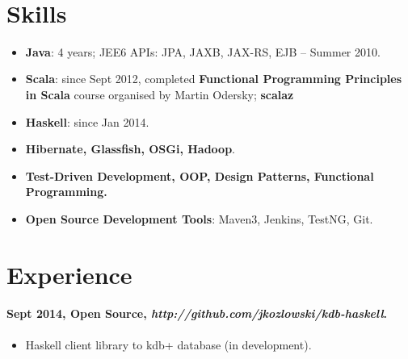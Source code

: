 \documentclass[11pt, a4paper]{article}
\newlength{\wideitemsep}
\let\olditem\item
\renewcommand{\item}{\setlength{\itemsep}{\wideitemsep}\olditem}
\begin{document}
\textsf{\\[0.1in]}


\section*{Skills}
\begin{itemize}
\item \textbf{Java}: 4 years; JEE6 APIs: JPA, JAXB, JAX-RS, EJB – Summer 2010.
\item \textbf{Scala}: since Sept 2012, completed \textbf{Functional Programming Principles in Scala} course organised by Martin Odersky; \textbf{scalaz} 
\item \textbf{Haskell}: since Jan 2014.
\item \textbf{Hibernate, Glassfish, OSGi, Hadoop}.
\item \textbf{Test-Driven Development, OOP, Design Patterns, Functional Programming.}
\item \textbf{Open Source Development Tools}: Maven3, Jenkins, TestNG, Git.
\end{itemize}

\section*{Experience}

\paragraph{Sept 2014, Open Source,  \textit{http://github.com/jkozlowski/kdb-haskell}.}
\begin{itemize}
\item Haskell client library to kdb+ database (in development). 
\end{itemize}
\end{document}
